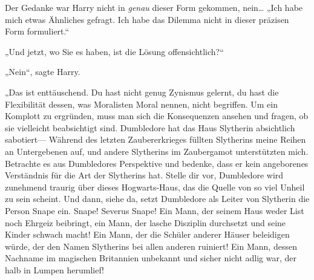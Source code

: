 Der Gedanke war Harry nicht in \emph{genau} dieser Form gekommen, nein…
„Ich habe mich etwas Ähnliches gefragt. Ich habe das Dilemma nicht in dieser präzisen Form formuliert.“

„Und jetzt, wo Sie es haben, ist die Lösung offensichtlich?“

„Nein“, sagte Harry.

„Das ist enttäuschend. Du hast nicht genug Zynismus gelernt, du hast die Flexibilität dessen, was Moralisten Moral nennen, nicht begriffen. Um ein Komplott zu ergründen, muss man sich die Konsequenzen ansehen und fragen, ob sie vielleicht beabsichtigt sind. Dumbledore hat das Haus Slytherin absichtlich sabotiert— Während des letzten Zaubererkrieges füllten Slytherins meine Reihen an Untergebenen auf, und andere Slytherins im Zaubergamot unterstützten mich. Betrachte es aus Dumbledores Perspektive und bedenke, dass er kein angeborenes Verständnis für die Art der Slytherins hat. Stelle dir vor, Dumbledore wird zunehmend traurig über dieses Hogwarts-Haus, das die Quelle von so viel Unheil zu sein scheint.
Und dann, siehe da, setzt Dumbledore als Leiter von Slytherin die Person Snape ein. Snape! Severus Snape! Ein Mann, der seinem Haus weder List noch Ehrgeiz beibringt, ein Mann, der lasche Disziplin durchsetzt und seine Kinder schwach macht! Ein Mann, der die Schüler anderer Häuser beleidigen würde, der den Namen Slytherins bei allen anderen ruiniert! Ein Mann, dessen Nachname im magischen Britannien unbekannt und sicher nicht adlig war, der halb in Lumpen herumlief!
